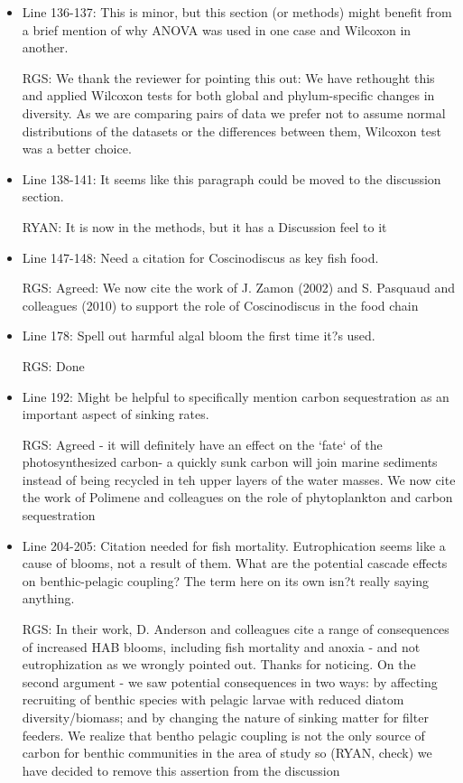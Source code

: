 \documentclass[11pt]{article}
\begin{document}
\begin{linenumbers}
\begin{itemize}
\item{Line 136-137: This is minor, but this section (or methods) might benefit from a brief mention of why ANOVA was used in one case and Wilcoxon in another.}

{\color{red} RGS: We thank the reviewer for pointing this out: We have rethought this and applied Wilcoxon tests for both global and phylum-specific changes in diversity. As we are comparing pairs of data we prefer not to assume normal distributions of the datasets or the differences between them, Wilcoxon test was a better choice. }


\item{Line 138-141: It seems like this paragraph could be moved to the discussion section.}

{\color{red} RYAN: It is now in the methods, but it has a Discussion feel to it }


\item{Line 147-148: Need a citation for Coscinodiscus as key fish food.}

{\color{red} RGS: Agreed: We now cite the work of J. Zamon (2002) and S. Pasquaud and colleagues (2010) to support the role of Coscinodiscus in the food chain }


\item{Line 178: Spell out harmful algal bloom the first time it?s used.}

{\color{red} RGS: Done }


\item{Line 192: Might be helpful to specifically mention carbon sequestration as an important aspect of sinking rates.}

{\color{red}RGS: Agreed - it will definitely have an effect on the `fate` of the photosynthesized carbon- a quickly sunk carbon will join marine sediments instead of being recycled in teh upper layers of the water masses. We now cite the work of Polimene and colleagues on the role of phytoplankton and carbon sequestration  }


\item{Line 204-205: Citation needed for fish mortality. Eutrophication seems like a cause of blooms, not a result of them. What are the potential cascade effects on benthic-pelagic coupling? The term here on its own isn?t really saying anything.}

{\color{red}RGS: In their work, D. Anderson and colleagues cite a range of consequences of increased HAB blooms, including fish mortality and anoxia - and not eutrophization as we wrongly pointed out. Thanks for noticing. On the second argument - we saw potential consequences in two ways: by affecting recruiting of benthic species with pelagic larvae with reduced diatom diversity/biomass; and by changing the nature of sinking matter for filter feeders. We realize that bentho pelagic coupling is not the only source of carbon for benthic communities in the area of study so (RYAN, check) we have decided to remove this assertion from the discussion }



\end{itemize}
\end{linenumbers}
\end{document}
